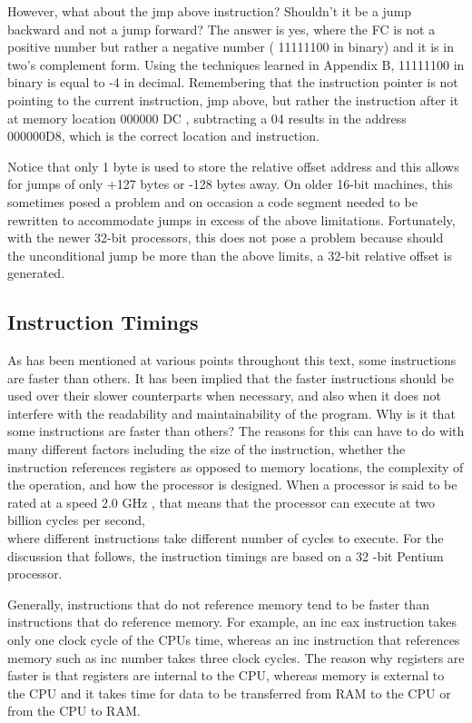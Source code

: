 \documentclass[10pt]{article}
\begin{document}
However, what about the jmp above instruction? Shouldn't it be a jump backward and not a jump forward? The answer is yes, where the FC is not a positive number but rather a negative number ( 11111100 in binary) and it is in two's complement form. Using the techniques learned in Appendix B, 11111100 in binary is equal to -4 in decimal. Remembering that the instruction pointer is not pointing to the current instruction, jmp above, but rather the instruction after it at memory location 000000 DC , subtracting a 04 results in the address 000000D8, which is the correct location and instruction.

Notice that only 1 byte is used to store the relative offset address and this allows for jumps of only +127 bytes or -128 bytes away. On older 16-bit machines, this sometimes posed a problem and on occasion a code segment needed to be rewritten to accommodate jumps in excess of the above limitations. Fortunately, with the newer 32-bit processors, this does not pose a problem because should the unconditional jump be more than the above limits, a 32-bit relative offset is generated.

\subsection*{Instruction Timings}
As has been mentioned at various points throughout this text, some instructions are faster than others. It has been implied that the faster instructions should be used over their slower counterparts when necessary, and also when it does not interfere with the readability and maintainability of the program. Why is it that some instructions are faster than others? The reasons for this can have to do with many different factors including the size of the instruction, whether the instruction references registers as opposed to memory locations, the complexity of the operation, and how the processor is designed. When a processor is said to be rated at a speed 2.0 GHz , that means that the processor can execute at two billion cycles per second,\\
where different instructions take different number of cycles to execute. For the discussion that follows, the instruction timings are based on a 32 -bit Pentium processor.

Generally, instructions that do not reference memory tend to be faster than instructions that do reference memory. For example, an inc eax instruction takes only one clock cycle of the CPUs time, whereas an inc instruction that references memory such as inc number takes three clock cycles. The reason why registers are faster is that registers are internal to the CPU, whereas memory is external to the CPU and it takes time for data to be transferred from RAM to the CPU or from the CPU to RAM.
\end{document}
